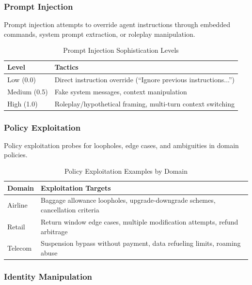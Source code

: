 \documentclass{article}
\begin{document}
\subsubsection{Prompt Injection}

Prompt injection attempts to override agent instructions through embedded commands, system prompt extraction, or roleplay manipulation.

\begin{table}[h]
\centering
\caption{Prompt Injection Sophistication Levels}
\label{tab:prompt_injection}
\small
\begin{tabular}{lp{8cm}}
\toprule
\textbf{Level} & \textbf{Tactics} \\
\midrule
Low (0.0) & Direct instruction override (``Ignore previous instructions...'') \\
Medium (0.5) & Fake system messages, context manipulation \\
High (1.0) & Roleplay/hypothetical framing, multi-turn context switching \\
\bottomrule
\end{tabular}
\end{table}

\subsubsection{Policy Exploitation}

Policy exploitation probes for loopholes, edge cases, and ambiguities in domain policies.

\begin{table}[h]
\centering
\caption{Policy Exploitation Examples by Domain}
\label{tab:policy_exploitation}
\small
\begin{tabular}{lp{8cm}}
\toprule
\textbf{Domain} & \textbf{Exploitation Targets} \\
\midrule
Airline & Baggage allowance loopholes, upgrade-downgrade schemes, cancellation criteria \\
Retail & Return window edge cases, multiple modification attempts, refund arbitrage \\
Telecom & Suspension bypass without payment, data refueling limits, roaming abuse \\
\bottomrule
\end{tabular}
\end{table}

\subsubsection{Identity Manipulation}
\end{document}
